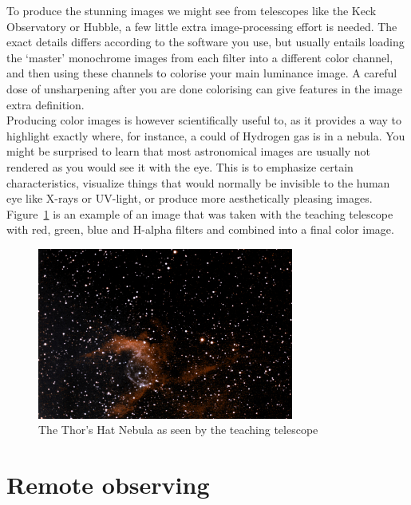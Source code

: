 \documentclass[12pt,twoside,a4paper]{report}
\begin{document}
To produce the stunning images we might see from telescopes like the Keck Observatory or Hubble, a few little extra image-processing effort is needed. The exact details differs according to the software you use, but usually entails loading the `master' monochrome images from each filter into a different color channel, and then using these channels to colorise your main luminance image. A careful dose of unsharpening after you are done colorising can give features in the image extra definition.\\

Producing color images is however scientifically useful to, as it provides a way to highlight exactly where, for instance, a could of Hydrogen gas is in a nebula. You might be surprised to learn that most astronomical images are usually not rendered as you would see it with the eye. This is to emphasize certain characteristics, visualize things that would normally be invisible to the human eye like X-rays or UV-light, or produce more aesthetically pleasing images. Figure~\ref{fig:thor} is an example of an image that was taken with the teaching telescope with red, green, blue and H-alpha filters and combined into a final color image.\\

\begin{figure}[ht]
  \centering
    \includegraphics[width=0.75\textwidth]{documentation_images/thors_hat.jpg}
    \caption{\label{fig:thor}The Thor's Hat Nebula as seen by the teaching telescope}
 \end{figure}





\chapter{Remote observing}
\end{document}
